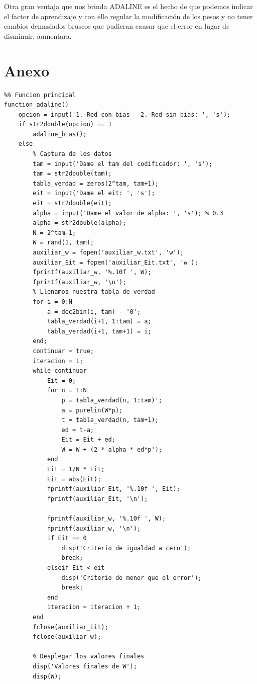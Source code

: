 \documentclass[12pt, titlepage]{article}
\begin{document}
    Otra gran ventaja que nos brinda ADALINE es el hecho de que podemos indicar el factor de aprendizaje y con ello regular la modificación de los pesos y no tener cambios demasiados bruscos que pudieran causar que el error en lugar de disminuir, aumentara.
    \newpage
    
    
    \newpage
    \section{Anexo}
\begin{lstlisting}
%% Funcion principal
function adaline()
    opcion = input('1.-Red con bias   2.-Red sin bias: ', 's');
    if str2double(opcion) == 1
        adaline_bias();
    else
        % Captura de los datos
        tam = input('Dame el tam del codificador: ', 's');
        tam = str2double(tam);
        tabla_verdad = zeros(2^tam, tam+1);
        eit = input('Dame el eit: ', 's');
        eit = str2double(eit);
        alpha = input('Dame el valor de alpha: ', 's'); % 0.3
        alpha = str2double(alpha);
        N = 2^tam-1;
        W = rand(1, tam);
        auxiliar_w = fopen('auxiliar_w.txt', 'w');
        auxiliar_Eit = fopen('auxiliar_Eit.txt', 'w');
        fprintf(auxiliar_w, '%.10f ', W);
        fprintf(auxiliar_w, '\n');
        % Llenamos nuestra tabla de verdad
        for i = 0:N
            a = dec2bin(i, tam) - '0';
            tabla_verdad(i+1, 1:tam) = a;
            tabla_verdad(i+1, tam+1) = i;
        end;
        continuar = true;
        iteracion = 1;
        while continuar
            Eit = 0;
            for n = 1:N
                p = tabla_verdad(n, 1:tam)';
                a = purelin(W*p);
                t = tabla_verdad(n, tam+1);
                ed = t-a;
                Eit = Eit + ed;
                W = W + (2 * alpha * ed*p');
            end
            Eit = 1/N * Eit;
            Eit = abs(Eit);
            fprintf(auxiliar_Eit, '%.10f ', Eit);
            fprintf(auxiliar_Eit, '\n');
            
            fprintf(auxiliar_w, '%.10f ', W);
            fprintf(auxiliar_w, '\n');
            if Eit == 0
                disp('Criterio de igualdad a cero');
                break;
            elseif Eit < eit
                disp('Criterio de menor que el error');
                break;
            end
            iteracion = iteracion + 1;
        end
        fclose(auxiliar_Eit);
        fclose(auxiliar_w);
        
        % Desplegar los valores finales
        disp('Valores finales de W');
        disp(W);
        

\end{lstlisting}
\end{document}

